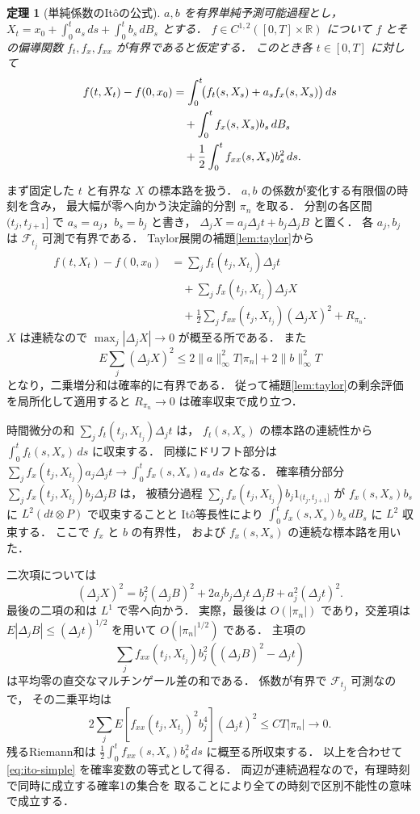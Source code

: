 \documentclass[a5paper,10pt,onecolumn]{jsarticle}
\makeatletter
\theoremstyle{mathnotetheorem}
\newtheorem{theorem}{定理}[section]
\renewcommand{\proofname}{証明}
\renewenvironment{proof}[1][\proofname]{%
  \par\pushQED{\qed}\normalfont\topsep4\p@\@plus2\p@\relax
  \trivlist\item[\hskip\labelsep\bfseries #1]\ignorespaces
}{\popQED\endtrivlist\@endpefalse}
\makeatother
\begin{document}
\begin{theorem}[単純係数のIt\^oの公式]\label{thm:ito-simple}
$a,b$ を有界単純予測可能過程とし，
$X_t=x_0+\int_0^ta_s\,ds+\int_0^tb_s\,dB_s$
とする．
$f\in C^{1,2}([0,T]\times\mathbb R)$ について
$f$ とその偏導関数 $f_t,f_x,f_{xx}$ が有界であると仮定する．
このとき各 $t\in[0,T]$ に対して
\begin{align}
 f(t,X_t)-f(0,x_0)
 &=\int_0^t\!\bigl(
 f_t(s,X_s)+a_sf_x(s,X_s)\bigr)\,ds\notag\\
 &\quad+\int_0^tf_x(s,X_s)b_s\,dB_s\notag\\
 &\quad+\frac12\int_0^tf_{xx}(s,X_s)b_s^2\,ds.
 \label{eq:ito-simple}
\end{align}
\end{theorem}
\begin{proof}
まず固定した $t$ と有界な $X$ の標本路を扱う．
$a,b$ の係数が変化する有限個の時刻を含み，
最大幅が零へ向かう決定論的分割 $\pi_n$ を取る．
分割の各区間 $(t_j,t_{j+1}]$ で
$a_s=a_j$，$b_s=b_j$ と書き，
$\Delta_jX=a_j\Delta_jt+b_j\Delta_jB$ と置く．
各 $a_j,b_j$ は $\mathcal F_{t_j}$ 可測で有界である．
Taylor展開の補題\ref{lem:taylor}から
\begin{align*}
 f(t,X_t)-f(0,x_0)
 &=\sum_j f_t(t_j,X_{t_j})\Delta_jt\\
 &\quad+\sum_jf_x(t_j,X_{t_j})\Delta_jX\\
 &\quad+\frac12\sum_jf_{xx}(t_j,X_{t_j})(\Delta_jX)^2
 +R_{\pi_n}.
\end{align*}
$X$ は連続なので
$\max_j|\Delta_jX|\to0$ が概至る所である．
また
\[
 E\sum_j(\Delta_jX)^2
 \le2\|a\|_\infty^2T|\pi_n|
     +2\|b\|_\infty^2T
\]
となり，二乗増分和は確率的に有界である．
従って補題\ref{lem:taylor}の剰余評価を局所化して適用すると
$R_{\pi_n}\to0$ は確率収束で成り立つ．

時間微分の和
$\sum_jf_t(t_j,X_{t_j})\Delta_jt$ は，
$f_t(s,X_s)$ の標本路の連続性から
$\int_0^tf_t(s,X_s)\,ds$ に収束する．
同様にドリフト部分は
$\sum_jf_x(t_j,X_{t_j})a_j\Delta_jt
 \to\int_0^tf_x(s,X_s)a_s\,ds$ となる．
確率積分部分
$\sum_jf_x(t_j,X_{t_j})b_j\Delta_jB$ は，
被積分過程
$\sum_jf_x(t_j,X_{t_j})b_j1_{(t_j,t_{j+1}]}$
が $f_x(s,X_s)b_s$ に
$L^2(dt\otimes P)$ で収束することと
It\^o等長性により
$\int_0^tf_x(s,X_s)b_s\,dB_s$ に $L^2$ 収束する．
ここで $f_x$ と $b$ の有界性，
および $f_x(s,X_s)$ の連続な標本路を用いた．

二次項については
\[
 (\Delta_jX)^2
 =b_j^2(\Delta_jB)^2
 +2a_jb_j\Delta_jt\,\Delta_jB
 +a_j^2(\Delta_jt)^2.
\]
最後の二項の和は $L^1$ で零へ向かう．
実際，最後は $O(|\pi_n|)$ であり，交差項は
$E|\Delta_jB|\le(\Delta_jt)^{1/2}$ を用いて
$O(|\pi_n|^{1/2})$ である．
主項の
\[
 \sum_j f_{xx}(t_j,X_{t_j})b_j^2
       ((\Delta_jB)^2-\Delta_jt)
\]
は平均零の直交なマルチンゲール差の和である．
係数が有界で $\mathcal F_{t_j}$ 可測なので，
その二乗平均は
\[
 2\sum_j E[f_{xx}(t_j,X_{t_j})^2b_j^4]
       (\Delta_jt)^2
 \le C T|\pi_n|\to0.
\]
残るRiemann和は
$\frac12\int_0^tf_{xx}(s,X_s)b_s^2\,ds$
に概至る所収束する．
以上を合わせて \eqref{eq:ito-simple} を確率変数の等式として得る．
両辺が連続過程なので，有理時刻で同時に成立する確率1の集合を
取ることにより全ての時刻で区別不能性の意味で成立する．
\end{proof}
\end{document}
